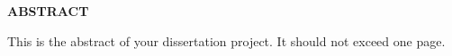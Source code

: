 \newpage
{}

\centerline{\bf \large ABSTRACT}
\vskip 10mm %
This is the abstract of your dissertation project.  It should not exceed one page.